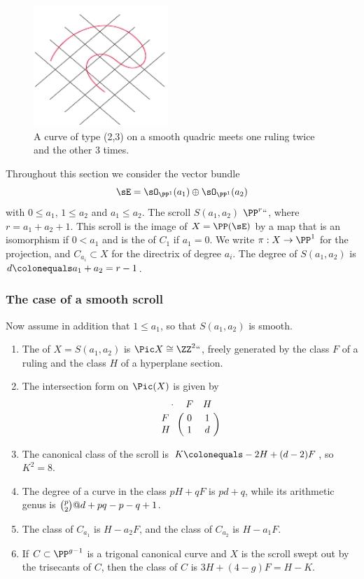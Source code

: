 \begin{figure}[b]
\centerline {\includegraphics[width=2in]{main/Fig16-2-new}}
\caption{A curve of type (2,3) on a smooth quadric meets one ruling
twice and the other 3 times.}
\label{2,3 on quadric}
\end{figure}

 Throughout this section we consider the vector
bundle
$$
\sE = \sO_{\PP^1}(a_1) \oplus\sO_{\PP^1}(a_2)
$$
with  $0\leq a_1$, $1\leq a_2$ and  $a_{1}\leq a_{2}$. The
scroll $ S(a_1, a_2)$
$\PP^r` `$, where $r= a_1+a_2+1$. This scroll
is the image of $X = \PP(\sE)$ by a map that is an isomorphism
if $0<a_1$ and is the 
%
of  $C_1$ if $a_1=0$.  We write $\pi:X
\to \PP^1$ for the projection, and
$C_{a_i}\subset X$ for the directrix of degree $a_i$. The degree of
$S(a_1,a_2)$ is $d \colonequals  a_1+a_2 = r-1$.

\subsubsection*{The case of a  smooth scroll}

Now assume in addition that $1\leq a_{1}$, so that $S(a_{1}, a_{2})$
is smooth.

\begin{theorem}\label{pic of scroll}

\begin{enumerate}

\item The 
%
of $X = S(a_1,a_2)$ is $\Pic X \cong \ZZ^2``$, 
freely generated by  the class $F$ of a ruling and the class $H$
of a  hyperplane section.
\item The
intersection form on $\Pic(X)$ is given by
$$
\bordermatrix{\kern 10pt\cdot&F&H\cr
F&0&1\cr
H&1&d
}
\vspace*{3pt}
$$

\item The canonical class of the scroll is $K \colonequals  -2H +(d-2)F$,
so $K^2 = 8$.

\item The degree of a curve in the class $pH+qF$ is $pd+q$, while its
arithmetic genus is
$\tbinom{p}{2}@d+pq-p-q+1$.

\item The class of $C_{a_1}$
is $H-a_2F$, and the class of $C_{a_2}$
is $H-a_1F$.
\item If $C \subset \PP^{g-1}$ is a trigonal canonical curve and $X$
is the scroll swept out by the trisecants of $C$, then the class of $C$
is $3H+(4-g)F = H-K$.
\unif
\end{enumerate}
\end{theorem}

